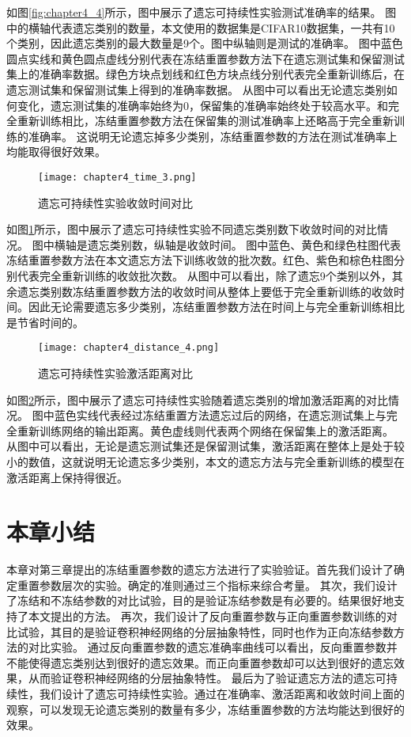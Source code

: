 如图\ref{fig:chapter4_4}所示，图中展示了遗忘可持续性实验测试准确率的结果。
图中的横轴代表遗忘类别的数量，本文使用的数据集是CIFAR10数据集，一共有10个类别，因此遗忘类别的最大数量是9个。图中纵轴则是测试的准确率。
图中蓝色圆点实线和黄色圆点虚线分别代表在冻结重置参数方法下在遗忘测试集和保留测试集上的准确率数据。绿色方块点划线和红色方块点线分别代表完全重新训练后，在遗忘测试集和保留测试集上得到的准确率数据。
从图中可以看出无论遗忘类别如何变化，遗忘测试集的准确率始终为0，保留集的准确率始终处于较高水平。和完全重新训练相比，冻结重置参数方法在保留集的测试准确率上还略高于完全重新训练的准确率。
这说明无论遗忘掉多少类别，冻结重置参数的方法在测试准确率上均能取得很好效果。

\begin{figure}
    \centering
    \texttt{[image: chapter4\_time\_3.png]}
    \caption{遗忘可持续性实验收敛时间对比}
    \label{fig:chapter4_time_3}
\end{figure}

如图\ref{fig:chapter4_time_3}所示，图中展示了遗忘可持续性实验不同遗忘类别数下收敛时间的对比情况。
图中横轴是遗忘类别数，纵轴是收敛时间。
图中蓝色、黄色和绿色柱图代表冻结重置参数方法在本文遗忘方法下训练收敛的批次数。红色、紫色和棕色柱图分别代表完全重新训练的收敛批次数。
从图中可以看出，除了遗忘9个类别以外，其余遗忘类别数冻结重置参数方法的收敛时间从整体上要低于完全重新训练的收敛时间。因此无论需要遗忘多少类别，冻结重置参数方法在时间上与完全重新训练相比是节省时间的。

\begin{figure}
    \centering
    \texttt{[image: chapter4\_distance\_4.png]}
    \caption{遗忘可持续性实验激活距离对比}
    \label{fig:chapter4_distance_4}
\end{figure}

如图\ref{fig:chapter4_distance_4}所示，图中展示了遗忘可持续性实验随着遗忘类别的增加激活距离的对比情况。
图中蓝色实线代表经过冻结重置方法遗忘过后的网络，在遗忘测试集上与完全重新训练网络的输出距离。黄色虚线则代表两个网络在保留集上的激活距离。
从图中可以看出，无论是遗忘测试集还是保留测试集，激活距离在整体上是处于较小的数值，这就说明无论遗忘多少类别，本文的遗忘方法与完全重新训练的模型在激活距离上保持得很近。

\section{本章小结}
本章对第三章提出的冻结重置参数的遗忘方法进行了实验验证。首先我们设计了确定重置参数层次的实验。确定的准则通过三个指标来综合考量。
其次，我们设计了冻结和不冻结参数的对比试验，目的是验证冻结参数是有必要的。结果很好地支持了本文提出的方法。
再次，我们设计了反向重置参数与正向重置参数训练的对比试验，其目的是验证卷积神经网络的分层抽象特性，同时也作为正向冻结参数方法的对比实验。
通过反向重置参数的遗忘准确率曲线可以看出，反向重置参数并不能使得遗忘类别达到很好的遗忘效果。而正向重置参数却可以达到很好的遗忘效果，从而验证卷积神经网络的分层抽象特性。
最后为了验证遗忘方法的遗忘可持续性，我们设计了遗忘可持续性实验。通过在准确率、激活距离和收敛时间上面的观察，可以发现无论遗忘类别的数量有多少，冻结重置参数的方法均能达到很好的效果。


